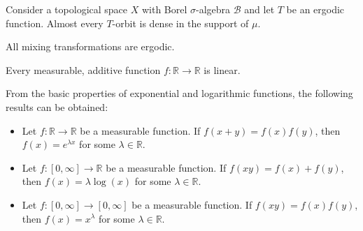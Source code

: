 
    \begin{property}
        Consider a topological space $X$ with Borel $\sigma$-algebra $\mathcal{B}$ and let $T$ be an ergodic function. Almost every $T$-orbit is dense in the support of $\mu$.
    \end{property}

    \begin{property}
        All mixing transformations are ergodic.
    \end{property}

    \begin{property}[Additivity]
        Every measurable, additive function $f:\mathbb{R}\rightarrow\mathbb{R}$ is linear.
    \end{property}
    \begin{result}
        From the basic properties of exponential and logarithmic functions, the following results can be obtained:
        \begin{itemize}
            \item Let $f:\mathbb{R}\rightarrow\mathbb{R}$ be a measurable function. If $f(x+y) = f(x)f(y)$, then $f(x)=e^{\lambda x}$ for some $\lambda\in\mathbb{R}$.
            \item Let $f:[0,\infty]\rightarrow\mathbb{R}$ be a measurable function. If $f(xy) = f(x)+f(y)$, then $f(x)=\lambda\log(x)$ for some $\lambda\in\mathbb{R}$.
            \item Let $f:[0,\infty]\rightarrow[0,\infty]$ be a measurable function. If $f(xy) = f(x)f(y)$, then $f(x)=x^\lambda$ for some $\lambda\in\mathbb{R}$.
        \end{itemize}
    \end{result}

